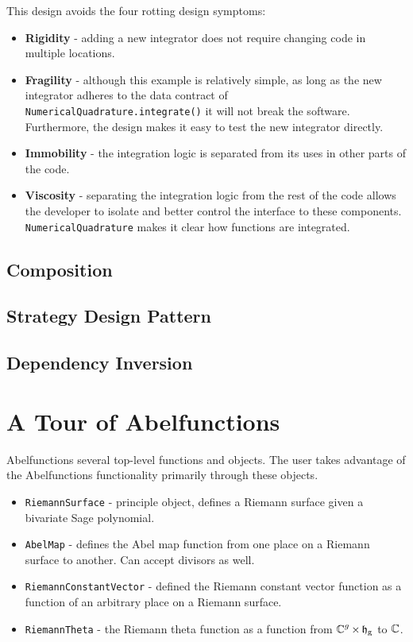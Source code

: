 This design avoids the four rotting design symptoms:
\begin{itemize}
\item {\bf Rigidity} - adding a new integrator does not require changing code in
  multiple locations.
\item {\bf Fragility} - although this example is relatively simple, as long as
  the new integrator adheres to the data contract of {\tt
    NumericalQuadrature.integrate()} it will not break the software.
  Furthermore, the design makes it easy to test the new integrator directly.
\item {\bf Immobility} - the integration logic is separated from its uses in
  other parts of the code. 
\item {\bf Viscosity} - separating the integration logic from the rest of the
  code allows the developer to isolate and better control the interface to these
  components. {\tt NumericalQuadrature} makes it clear how functions are
  integrated.
\end{itemize}



      

\subsection{Composition}

\subsection{Strategy Design Pattern}

\subsection{Dependency Inversion}


\section{A Tour of Abelfunctions}\label{sec:abelfunctions-a-tour-of-abelfunctions}

Abelfunctions several top-level functions and objects. The user takes advantage
of the Abelfunctions functionality primarily through these objects.
\begin{itemize}
  \item {\tt RiemannSurface} - principle object, defines a Riemann surface given
    a bivariate Sage polynomial.
  \item {\tt AbelMap} - defines the Abel map function from one place on a
    Riemann surface to another. Can accept divisors as well.
  \item {\tt RiemannConstantVector} - defined the Riemann constant vector
    function as a function of an arbitrary place on a Riemann surface.
  \item {\tt RiemannTheta} - the Riemann theta function as a function from
    $\operatorname{\mathbb{C}}^g \times \operatorname{\mathfrak{h}_g}$ to $\operatorname{\mathbb{C}}$.
\end{itemize}

